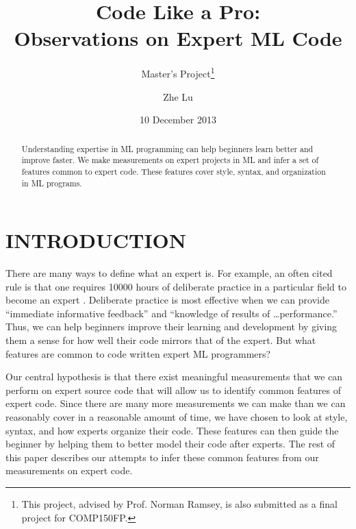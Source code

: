 \documentclass[12pt,abstracton]{scrartcl}
\title{Code Like a Pro:\\Observations on Expert ML Code}
\subtitle{Master's Project\footnote{This project, advised by Prof. Norman Ramsey, is also submitted as a final project for COMP150FP.}}
\author{Zhe Lu}
\date{10 December 2013}
\begin{document}


\maketitle
\begin{abstract}
Understanding expertise in ML programming can help beginners learn better and improve faster.
We make measurements on expert projects in ML and infer
a set of features common to expert code. These features cover
style, syntax, and organization in ML programs.
\end{abstract}
\section{INTRODUCTION}
There are many ways to define what an expert is.
For example, an often cited rule is that one requires 10000 hours of deliberate practice
in a particular field to become an expert \cite{Gla08}.
Deliberate practice is most effective when we can provide ``immediate informative feedback''
and ``knowledge of results of \ldots performance.'' \cite{Eri93} Thus, we can help beginners
improve their learning and development
by giving them a sense for how well their code mirrors that of the expert.
But what features are common to code written expert ML programmers?

Our central hypothesis is that there exist meaningful measurements
that we can perform on expert source code that will allow us
to identify common features of expert code. Since there are many more
measurements we can make than we can reasonably cover in a reasonable
amount of time, we have chosen to look at style,
syntax, and how experts organize their code.
These features can then guide the beginner by helping them
to better model their code after experts.
The rest of this paper describes our attempts to infer these
common features from our measurements on expert code.
\end{document}
